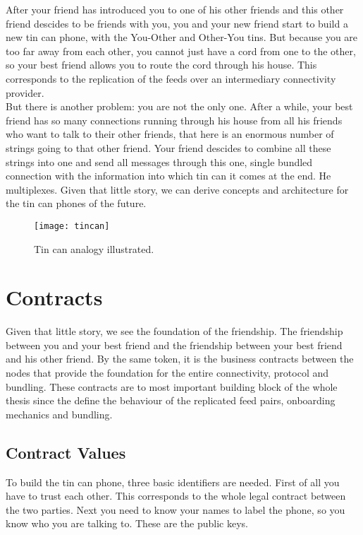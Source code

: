 After your friend has introduced you to one of his other friends and this other friend descides to be friends with you, you and your new friend start to build a new tin can phone, with the You-Other and Other-You tins. But because you are too far away from each other, you cannot just have a cord from one to the other, so your best friend allows you to route the cord through his house. This corresponds to the replication of the feeds over an intermediary connectivity provider.\\

But there is another problem: you are not the only one. After a while, your best friend has so many connections running through his house from all his friends who want to talk to their other friends, that here is an enormous number of strings going to that other friend. Your friend descides to combine all these strings into one and send all messages through this one, single bundled connection with the information into which tin can it comes at the end. He multiplexes. Given that little story, we can derive concepts and architecture for the tin can phones of the future. 

\begin{figure}
    \centering
    \texttt{[image: tincan]}
    \caption{Tin can analogy illustrated.}
    \label{fig:tincan}
\end{figure}

\section{Contracts}
Given that little story, we see the foundation of the friendship. The friendship between you and your best friend and the friendship between your best friend and his other friend. By the same token, it is the business contracts between the nodes that provide the foundation for the entire connectivity, protocol and bundling. These contracts are to most important building block of the whole thesis since the define the behaviour of the replicated feed pairs,  onboarding mechanics and bundling.

\subsection{Contract Values}
To build the tin can phone, three basic identifiers are needed. First of all you have to trust each other. This corresponds to the whole legal contract between the two parties. Next you need to know your names to label the phone, so you know who you are talking to. These are the public keys. \\

